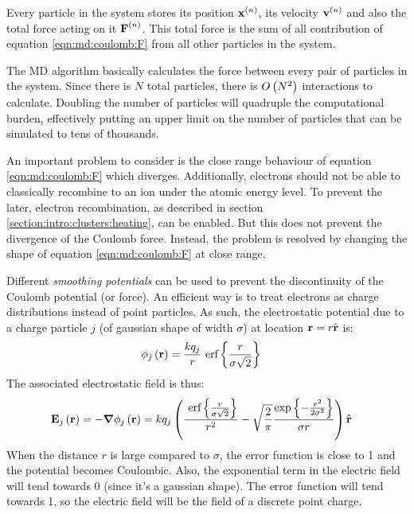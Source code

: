 Every particle in the system stores its position $\textbf{x}^{\left( n \right)}$, its velocity
$\textbf{v}^{\left( n \right)}$ and also the total force acting on it $\textbf{F}^{\left( n \right)}$. This total
force is the sum of all contribution of equation \eqref{eqn:md:coulomb:F} from
all other particles in the system.

The MD algorithm basically calculates the force between every pair of particles
in the system. Since there is $N$ total particles, there is $O\left( N^2 \right)$
interactions to calculate. Doubling the number of particles will quadruple the
computational burden, effectively putting an upper limit on the number of
particles that can be simulated to tens of thousands.

An important problem to consider is the close range behaviour of equation
\eqref{eqn:md:coulomb:F} which diverges. Additionally, electrons should not be
able to classically recombine to an ion under the atomic energy level. To
prevent the later, electron recombination, as described in section
\ref{section:intro:clusters:heating}, can be enabled. But this does not prevent
the divergence of the Coulomb force. Instead, the problem is resolved by
changing the shape of equation \eqref{eqn:md:coulomb:F} at close range.

Different \textit{smoothing potentials} can be used to prevent the
discontinuity of the Coulomb potential (or force). An efficient way is to treat
electrons as charge distributions instead of point particles. As such, the
electrostatic potential due to a charge particle $j$ (of gaussian shape of
width $\sigma$) at location $\textbf{r} = r \hat{\textbf{r}}$ is:
\begin{align}
\phi_{j}\left( \textbf{r} \right) & = \frac{k q_j}{r} ~\textrm{erf} \left\{\frac{r}{\sigma \sqrt{2}}\right\}
\label{eqn:md:smoothed:phi}
\end{align}
The associated electrostatic field is thus:
\begin{align}
\textbf{E}_{j}\left( \textbf{r} \right) & = -\bm{\nabla} \phi_j\left( \textbf{r} \right) = k q_j \left( 
    \frac{ ~\textrm{erf} \left\{\frac{r}{\sigma\sqrt{2}}\right\} }{r^2}
    - \sqrt{\frac{2}{\pi}} \frac{ \exp{ \left\{ -\frac{r^2}{2 \sigma^2} \right\}} }{\sigma r}
 \right) \hat{\textbf{r}}
\label{eqn:md:smoothed:E}
\end{align}
When the distance $r$ is large compared to $\sigma$, the error function
is close to 1 and the potential becomes Coulombic. Also, the exponential
term in the electric field will tend towards 0 (since it's a gaussian shape).
The error function will tend towards 1, so the electric field will
be the field of a discrete point charge.

